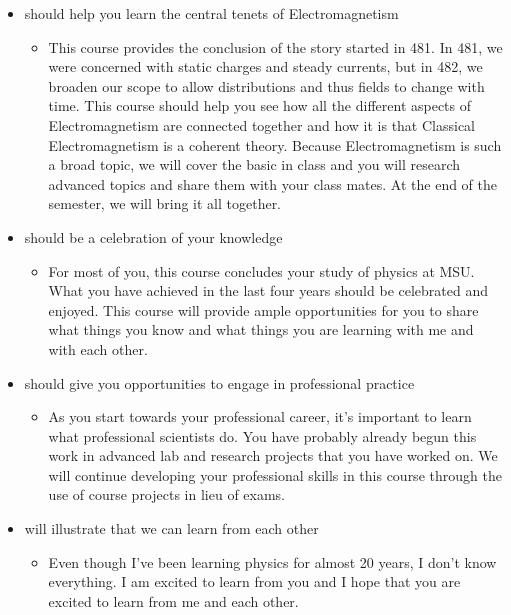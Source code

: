 \documentclass[letterpaper,10pt,english]{jupyterBook}
\begin{document}
\begin{itemize}
\item {} 
 should help you learn the central tenets of Electromagnetism
\begin{itemize}
\item {} 
\sphinxAtStartPar
This course provides the conclusion of the story started in 481. In 481, we were concerned with static charges and steady currents, but in 482, we broaden our scope to allow distributions and thus fields to change with time. This course should help you see how all the different aspects of Electromagnetism are connected together and how it is that Classical Electromagnetism is a coherent theory. Because Electromagnetism is such a broad topic, we will cover the basic in class and you will research advanced topics and share them with your class mates. At the end of the semester, we will bring it all together.

\end{itemize}

\item {} 
 should be a celebration of your knowledge
\begin{itemize}
\item {} 
\sphinxAtStartPar
For most of you, this course concludes your study of physics at MSU. What you have achieved in the last four years should be celebrated and enjoyed. This course will provide ample opportunities for you to share what things you know and what things you are learning with me and with each other.

\end{itemize}

\item {} 
 should give you opportunities to engage in professional practice
\begin{itemize}
\item {} 
\sphinxAtStartPar
As you start towards your professional career, it’s important to learn what professional scientists do. You have probably already begun this work in advanced lab and research projects that you have worked on. We will continue developing your professional skills in this course through the use of course projects in lieu of exams.

\end{itemize}

\item {} 
 will illustrate that we can learn from each other
\begin{itemize}
\item {} 
\sphinxAtStartPar
Even though I’ve been learning physics for almost 20 years, I don’t know everything. I am excited to learn from you and I hope that you are excited to learn from me and each other.

\end{itemize}

\end{itemize}
\end{document}
